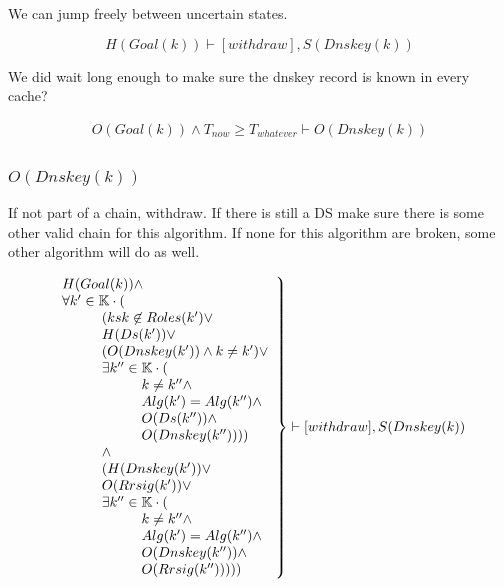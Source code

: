 \documentclass[twoside,english, a4paper]{article}
\newcommand{\mathbox}[1]{#1}
\begin{document}
\mathbox{

	We can jump freely between uncertain states.
	
	\begin{equation}
			H(Goal(k)) \vdash [withdraw], S(Dnskey(k))
	\end{equation}

	We did wait long enough to make sure the dnskey record is known in 
	every cache?
	
	\begin{equation}
		\begin{split}
			O(Goal(k)) \wedge T_{now} \geq T_{whatever} \vdash O(Dnskey(k))
		\end{split}
	\end{equation}
}

\subsubsection{$O(Dnskey(k))$}

\mathbox{

	If not part of a chain, withdraw. If there is still a DS make sure 
	there is some other valid chain for this algorithm. If none for 
	this algorithm are broken, some other algorithm will do as well.
	
	\begin{equation}
		\left.
		\begin{array}{l}
			H(Goal(k)) \wedge\\
\hskip 0cm	\forall k' \in \mathbb{K} \cdot (\\
\hskip 1cm		(ksk \not \in Roles(k') \vee\\
\hskip 1cm		H(Ds(k')) \vee \\
\hskip 1cm		(O(Dnskey(k')) \wedge k \neq k') \vee \\
\hskip 1cm		\exists k'' \in \mathbb{K} \cdot (\\
\hskip 2cm			k \neq k'' \wedge \\
\hskip 2cm			Alg(k')=Alg(k'') \wedge \\
\hskip 2cm			O(Ds(k'')) \wedge \\
\hskip 2cm			O(Dnskey(k'')))) \\
\hskip 1cm		\wedge \\
\hskip 1cm		(H(Dnskey(k')) \vee \\
\hskip 1cm		O(Rrsig(k'))  \vee \\
\hskip 1cm		\exists k'' \in \mathbb{K} \cdot (\\
\hskip 2cm			k \neq k'' \wedge \\
\hskip 2cm			Alg(k')=Alg(k'') \wedge \\
\hskip 2cm			O(Dnskey(k'')) \wedge \\
\hskip 2cm			O(Rrsig(k'')))))
		\end{array}
		\right\} \vdash [withdraw], S(Dnskey(k))
	\end{equation}
}
\end{document}
